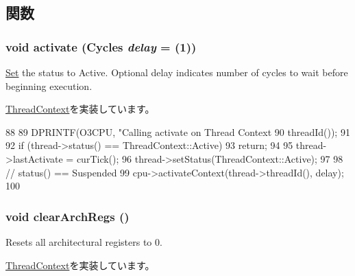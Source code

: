 \subsection{関数}
\hypertarget{classO3ThreadContext_ab542a5cf9ce4b41042d61e42dfe3aeab}{
\subsubsection[{activate}]{\setlength{\rightskip}{0pt plus 5cm}void activate ({\bf Cycles} {\em delay} = {(1)})}}
\label{classO3ThreadContext_ab542a5cf9ce4b41042d61e42dfe3aeab}
\hyperlink{classSet}{Set} the status to Active. Optional delay indicates number of cycles to wait before beginning execution. 

\hyperlink{classThreadContext_a9270160e6cce25ded6999f6e4e60a3ed}{ThreadContext}を実装しています。


\begin{DoxyCode}
88 {
89     DPRINTF(O3CPU, "Calling activate on Thread Context %
90             threadId());
91 
92     if (thread->status() == ThreadContext::Active)
93         return;
94 
95     thread->lastActivate = curTick();
96     thread->setStatus(ThreadContext::Active);
97 
98     // status() == Suspended
99     cpu->activateContext(thread->threadId(), delay);
100 }
\end{DoxyCode}
\hypertarget{classO3ThreadContext_ad5c88ea41846742bd8c70d9c50f31945}{
\subsubsection[{clearArchRegs}]{\setlength{\rightskip}{0pt plus 5cm}void clearArchRegs ()}}
\label{classO3ThreadContext_ad5c88ea41846742bd8c70d9c50f31945}
Resets all architectural registers to 0. 

\hyperlink{classThreadContext_ae0375c0a094eeb6fe8f73db4393d4ceb}{ThreadContext}を実装しています。


